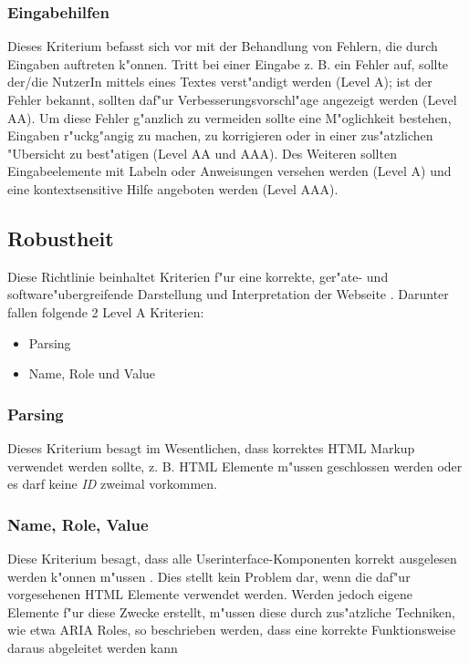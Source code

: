 \documentclass[a4paper,bibtotoc,oneside]{scrbook}
\begin{document}
\subsubsection{Eingabehilfen}
Dieses Kriterium befasst sich vor mit der Behandlung von Fehlern, die durch Eingaben auftreten k"onnen. Tritt bei einer Eingabe z. B. ein Fehler auf, sollte der/die NutzerIn mittels eines Textes verst"andigt werden (Level A); ist der Fehler bekannt, sollten daf"ur Verbesserungsvorschl"age angezeigt werden (Level AA). Um diese Fehler g"anzlich zu vermeiden sollte eine M"oglichkeit bestehen, Eingaben r"uckg"angig zu machen, zu korrigieren oder in einer zus"atzlichen "Ubersicht zu best"atigen (Level AA und AAA). Des Weiteren sollten Eingabeelemente mit Labeln oder Anweisungen versehen werden (Level A) und eine kontextsensitive Hilfe angeboten werden (Level AAA). \cite[Abschnitt 3.3]{wcag2}

\subsection{Robustheit}
Diese Richtlinie beinhaltet Kriterien f"ur eine korrekte, ger"ate- und software"ubergreifende Darstellung und Interpretation der Webseite \cite[Abschnitt 4.1]{wcag2}. Darunter fallen folgende 2 Level A Kriterien: 

\begin{itemize}
\item Parsing \cite[Abschnitt 4.1.1]{wcag2}
\item Name, Role und Value \cite[Abschnitt 4.1.2]{wcag2}
\end{itemize}

\subsubsection{Parsing}
Dieses Kriterium besagt im Wesentlichen, dass korrektes HTML Markup verwendet werden sollte, z. B. HTML Elemente m"ussen geschlossen werden oder es darf keine \emph{ID} zweimal vorkommen. \cite[Abschnitt 4.1.1]{wcag2}

\subsubsection{Name, Role, Value}
Diese Kriterium besagt, dass alle Userinterface-Komponenten korrekt ausgelesen werden k"onnen m"ussen \cite[Abschnitt 4.1.2]{wcag2}. Dies stellt kein Problem dar, wenn die daf"ur vorgesehenen HTML Elemente verwendet werden. Werden jedoch eigene Elemente f"ur diese Zwecke erstellt, m"ussen diese durch zus"atzliche Techniken, wie etwa ARIA Roles, so beschrieben werden, dass eine korrekte Funktionsweise daraus abgeleitet werden kann \cite[Abschnitt Intent of this Success Criterion]{understand_412}
\end{document}
